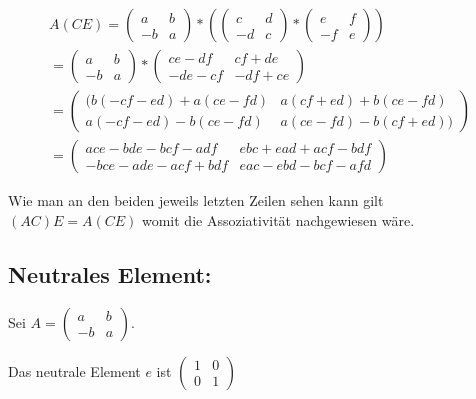 \documentclass{article}
\begin{document}

\[
\begin{split}
A(CE)
=
\begin{pmatrix}
  a & b \\
  -b & a
\end{pmatrix}
*
\left (
\begin{pmatrix}
  c & d \\
  -d & c
\end{pmatrix}
*
\begin{pmatrix}
  e & f \\
  -f & e
\end{pmatrix}
\right )
\\
=
\begin{pmatrix}
  a & b \\
  -b & a
\end{pmatrix}
*
\begin{pmatrix}
  ce - df & cf + de \\
  -de - cf & -df + ce
\end{pmatrix}
\\
=
\begin{pmatrix}
  (b (-c f - e d) + a (c e - f d) & a (c f + e d) + b (c e - f d) \\
  a (-c f - e d) - b (c e - f d) & a (c e - f d) - b (c f + e d))
\end{pmatrix}
\\
=
\begin{pmatrix}
    ace - bde - bcf - adf & ebc + ead + acf -bdf \\
    -bce - ade - acf + bdf & eac - ebd - bcf - afd
\end{pmatrix}
\end{split}
\]

Wie man an den beiden jeweils letzten Zeilen sehen kann gilt \((AC)E=A(CE)\) womit die Assoziativität nachgewiesen wäre.

\subsection*{Neutrales Element:}

Sei
\(
A=
\begin{pmatrix}
a & b \\
-b & a
\end{pmatrix}
\).

Das neutrale Element \(e\) ist
\(
\begin{pmatrix}
1 & 0 \\
0 & 1
\end{pmatrix}
\)
\end{document}
